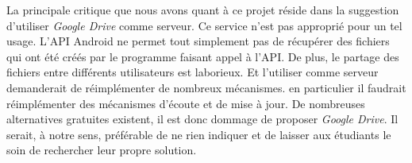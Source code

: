 La principale critique que nous avons quant à ce projet réside dans la suggestion d'utiliser \textit{Google Drive} comme serveur. Ce service n'est pas approprié pour un tel usage. L'API Android ne permet tout simplement pas de récupérer des fichiers qui
ont été créés par le programme faisant appel à l'API. De plus, le partage des fichiers entre différents utilisateurs est
laborieux. Et l'utiliser comme serveur demanderait  de réimplémenter de nombreux mécanismes. en particulier il faudrait
réimplémenter des mécanismes d'écoute et de mise à jour. De nombreuses alternatives gratuites existent, il est donc dommage de
proposer \textit{Google Drive}. Il serait, à notre sens, préférable de ne rien indiquer et de laisser aux étudiants le soin de
rechercher leur propre solution.
